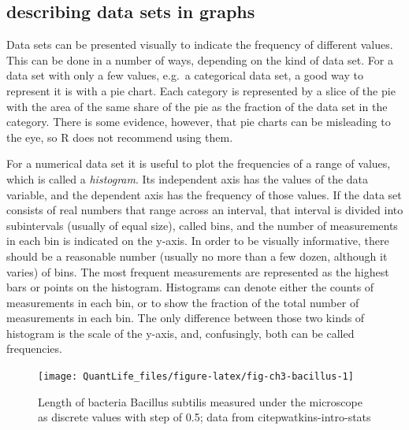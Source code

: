 \documentclass[
]{book}
\theoremstyle{definition}
\theoremstyle{definition}
\theoremstyle{definition}
\theoremstyle{remark}
\begin{document}
\hypertarget{describing-data-sets-in-graphs}{%
\subsection{describing data sets in graphs}\label{describing-data-sets-in-graphs}}

Data sets can be presented visually to indicate the frequency of different values. This can be done in a number of ways, depending on the kind of data set. For a data set with only a few values, e.g.~a categorical data set, a good way to represent it is with a pie chart. Each category is represented by a slice of the pie with the area of the same share of the pie as the fraction of the data set in the category. There is some evidence, however, that pie charts can be misleading to the eye, so R does not recommend using them.

For a numerical data set it is useful to plot the frequencies of a range of values, which is called a  \emph{histogram}. Its independent axis has the values of the data variable, and the dependent axis has the frequency of those values. If the data set consists of real numbers that range across an interval, that interval is divided into subintervals (usually of equal size), called bins, and the number of measurements in each bin is indicated on the y-axis. In order to be visually informative, there should be a reasonable number (usually no more than a few dozen, although it varies) of bins. The most frequent measurements are represented as the highest bars or points on the histogram. Histograms can denote either the counts of measurements in each bin, or to show the fraction of the total number of measurements in each bin. The only difference between those two kinds of histogram is the scale of the y-axis, and, confusingly, both can be called frequencies.

\begin{figure}

{\centering \texttt{[image: QuantLife\_files/figure-latex/fig-ch3-bacillus-1]} 

}

\caption{Length of bacteria Bacillus subtilis measured under the microscope as discrete values with step of 0.5; data from citep{watkins-intro-stats}}\label{fig:fig-ch3-bacillus}
\end{figure}
\end{document}
